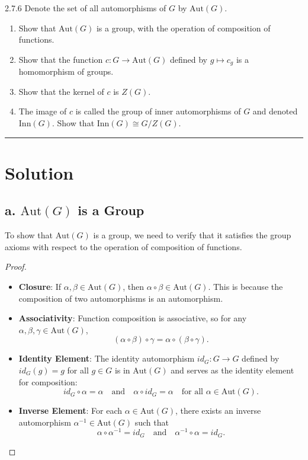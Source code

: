 \documentclass[12pt]{amsart}
\theoremstyle{definition}
\numberwithin{equation}{section}
\begin{document}
\begin{exercise}{2.7.6} Denote the set of all automorphisms of \(G\) by \(\text{Aut}(G)\).
    \begin{enumerate}[label=\textbf{\alph*.}]
        \item Show that \(\text{Aut}(G)\) is a group, with the operation of composition of functions.
        \item Show that the function \(c:G\rightarrow \text{Aut}(G)\) defined by \(g \mapsto c_g\) is a homomorphism of groups.
        \item Show that the kernel of \(c\) is \(Z(G)\).
        \item The image of \(c\) is called the group of inner automorphisms of \(G\) and denoted \(\text{Inn}(G)\). Show that \(\text{Inn}(G) \cong G/Z(G)\).
    \end{enumerate}

    \noindent\rule{\linewidth}{1pt}
    
    \section*{Solution}
    
    \subsection*{a. \(\text{Aut}(G)\) is a Group}
    
    To show that \(\text{Aut}(G)\) is a group, we need to verify that it satisfies the group axioms with respect to the operation of composition of functions.
    
    \begin{proof} \( \)
    
    \begin{itemize}
        \item \textbf{Closure}: If \(\alpha, \beta \in \text{Aut}(G)\), then \(\alpha \circ \beta \in \text{Aut}(G)\). This is because the composition of two automorphisms is an automorphism.
        \item \textbf{Associativity}: Function composition is associative, so for any \(\alpha, \beta, \gamma \in \text{Aut}(G)\),
        \[
        (\alpha \circ \beta) \circ \gamma = \alpha \circ (\beta \circ \gamma).
        \]
        \item \textbf{Identity Element}: The identity automorphism \(id_G: G \to G\) defined by \(id_G(g) = g\) for all \(g \in G\) is in \(\text{Aut}(G)\) and serves as the identity element for composition:
        \[
        id_G \circ \alpha = \alpha \quad \text{and} \quad \alpha \circ id_G = \alpha \quad \text{for all } \alpha \in \text{Aut}(G).
        \]
        \item \textbf{Inverse Element}: For each \(\alpha \in \text{Aut}(G)\), there exists an inverse automorphism \(\alpha^{-1} \in \text{Aut}(G)\) such that
        \[
        \alpha \circ \alpha^{-1} = id_G \quad \text{and} \quad \alpha^{-1} \circ \alpha = id_G.
        \]
    \end{itemize}
    

\end{proof}
\end{exercise}
\end{document}
